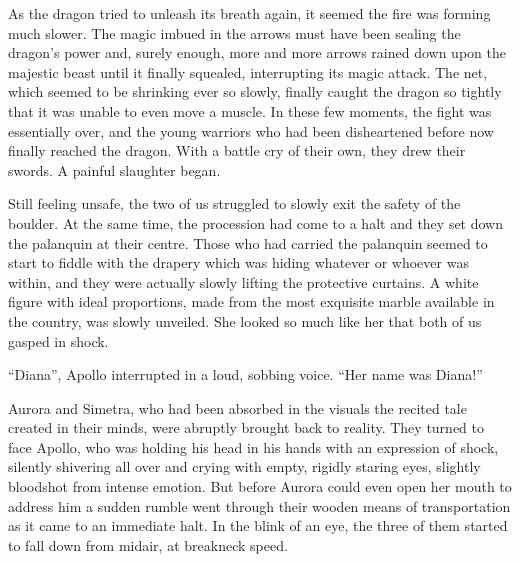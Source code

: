 As the dragon tried to unleash its breath again, it seemed the fire was forming much slower. The magic imbued in the arrows must have been sealing the dragon's power and, surely enough, more and more arrows rained down upon the majestic beast until it finally squealed, interrupting its magic attack. The net, which seemed to be shrinking ever so slowly, finally caught the dragon so tightly that it was unable to even move a muscle. In these few moments, the fight was essentially over, and the young warriors who had been disheartened before now finally reached the dragon. With a battle cry of their own, they drew their swords. A painful slaughter began.

Still feeling unsafe, the two of us struggled to slowly exit the safety of the boulder. At the same time, the procession had come to a halt and they set down the palanquin at their centre. Those who had carried the palanquin seemed to start to fiddle with the drapery which was hiding whatever or whoever was within, and they were actually slowly lifting the protective curtains. A white figure with ideal proportions, made from the most exquisite marble available in the country, was slowly unveiled. She looked so much like her that both of us gasped in shock.

\fancybreaker{}

\enquote{Diana}, Apollo interrupted in a loud, sobbing voice. \enquote{Her name was Diana!}

Aurora and Simetra, who had been absorbed in the visuals the recited tale created in their minds, were abruptly brought back to reality. They turned to face Apollo, who was holding his head in his hands with an expression of shock, silently shivering all over and crying with empty, rigidly staring eyes, slightly bloodshot from intense emotion. But before Aurora could even open her mouth to address him a sudden rumble went through their wooden means of transportation as it came to an immediate halt. In the blink of an eye, the three of them started to fall down from midair, at breakneck speed.
